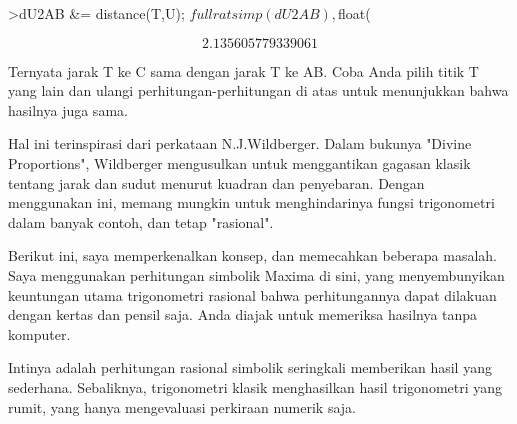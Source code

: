 \documentclass[12pt,arial,letterpaper]{book}
\begin{document}
\begin{eulercomment}
\begin{eulercomment}
\begin{eulercomment}
\begin{eulercomment}
\begin{eulercomment}
\begin{eulercomment}
\begin{eulercomment}
\begin{eulercomment}
\begin{eulercomment}
\begin{eulercomment}
\begin{eulercomment}
\begin{eulercomment}
\begin{eulercomment}
\begin{eulercomment}
\begin{eulercomment}
\begin{eulercomment}
\begin{eulercomment}
\begin{eulercomment}
\begin{eulercomment}
\begin{eulercomment}
\begin{eulercomment}
\begin{eulercomment}
\begin{eulercomment}
\begin{eulercomment}
\begin{eulercomment}
\begin{eulercomment}
\begin{eulerformula}
\end{eulerformula}
\begin{eulerprompt}
>dU2AB &= distance(T,U); $fullratsimp(dU2AB), $float(%
\end{eulerprompt}
\begin{eulerformula}
\[
2.135605779339061
\]
\end{eulerformula}
\begin{eulercomment}
Ternyata jarak T ke C sama dengan jarak T ke AB. Coba Anda pilih titik T yang lain dan
ulangi perhitungan-perhitungan di atas untuk menunjukkan bahwa hasilnya juga sama.
\end{eulercomment}
\begin{eulercomment}

\begin{eulercomment}
\begin{eulercomment}
Hal ini terinspirasi dari perkataan N.J.Wildberger. Dalam bukunya
"Divine Proportions", Wildberger mengusulkan untuk menggantikan
gagasan klasik tentang jarak dan sudut menurut kuadran dan penyebaran.
Dengan menggunakan ini, memang mungkin untuk menghindarinya fungsi
trigonometri dalam banyak contoh, dan tetap "rasional".

Berikut ini, saya memperkenalkan konsep, dan memecahkan beberapa
masalah. Saya menggunakan perhitungan simbolik Maxima di sini, yang
menyembunyikan keuntungan utama trigonometri rasional bahwa
perhitungannya dapat dilakuan dengan kertas dan pensil saja.  Anda
diajak untuk memeriksa hasilnya tanpa komputer.

Intinya adalah perhitungan rasional simbolik seringkali memberikan
hasil yang sederhana.  Sebaliknya, trigonometri klasik menghasilkan
hasil trigonometri yang rumit, yang hanya mengevaluasi perkiraan
numerik saja.


\end{eulercomment}
\end{eulercomment}
\end{eulercomment}
\end{eulercomment}
\end{eulercomment}
\end{eulercomment}
\end{eulercomment}
\end{eulercomment}
\end{eulercomment}
\end{eulercomment}
\end{eulercomment}
\end{eulercomment}
\end{eulercomment}
\end{eulercomment}
\end{eulercomment}
\end{eulercomment}
\end{eulercomment}
\end{eulercomment}
\end{eulercomment}
\end{eulercomment}
\end{eulercomment}
\end{eulercomment}
\end{eulercomment}
\end{eulercomment}
\end{eulercomment}
\end{eulercomment}
\end{eulercomment}
\end{eulercomment}
\end{eulercomment}
\end{document}
